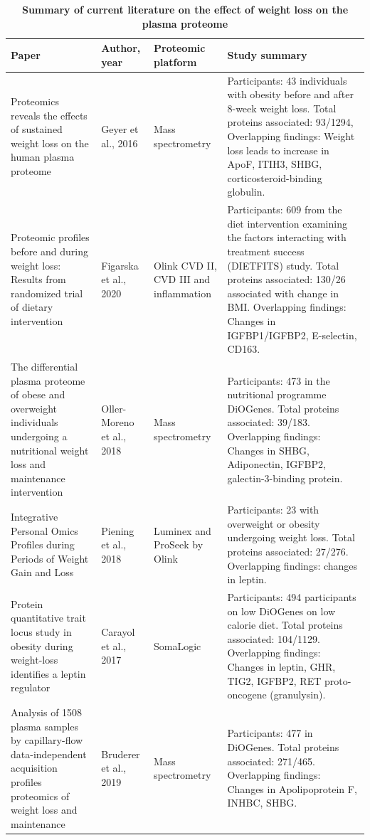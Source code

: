 \documentclass[11pt,twoside]{bristolthesis}
\begin{document}
\begin{landscape}\begin{table}

\caption[Summary of current literature on the effect of weight loss on the plasma proteome]{\label{tab:weight-loss-protein}\textbf{Summary of current literature on the effect of weight loss on the plasma proteome}}
\centering
\begin{tabu} to 
\toprule
Paper & Author, year & Proteomic platform & Study summary\\
\midrule
Proteomics reveals the effects of sustained weight loss on the human plasma proteome & Geyer et al., 2016 & Mass spectrometry & Participants: 43 individuals with obesity before and after 8-week weight loss.
Total proteins associated: 93/1294,
Overlapping findings: Weight loss leads to increase in ApoF, ITIH3, SHBG, corticosteroid-binding globulin.\\
Proteomic profiles before and during weight loss: Results from randomized trial of dietary intervention & Figarska et al., 2020 & Olink CVD II, CVD III and inflammation & Participants: 609 from the diet intervention examining the factors interacting with treatment success (DIETFITS) study.
Total proteins associated: 130/26 associated with change in BMI.
Overlapping findings: Changes in IGFBP1/IGFBP2, E-selectin, CD163.\\
The differential plasma proteome of obese and overweight individuals undergoing a nutritional weight loss and maintenance intervention & Oller-Moreno et al., 2018 & Mass spectrometry & Participants: 473 in the nutritional programme DiOGenes.
Total proteins associated: 39/183.
Overlapping findings: Changes in SHBG, Adiponectin, IGFBP2, galectin-3-binding protein.\\
Integrative Personal Omics Profiles during Periods of Weight Gain and Loss & Piening et al., 2018 & Luminex and ProSeek by Olink & Participants: 23 with overweight or obesity undergoing weight loss.
Total proteins associated: 27/276.
Overlapping findings: changes in leptin.\\
Protein quantitative trait locus study in obesity during weight-loss identifies a leptin regulator & Carayol et al., 2017 & SomaLogic & Participants: 494 participants on low DiOGenes on low calorie diet.
Total proteins associated: 104/1129.
Overlapping findings: Changes in leptin, GHR, TIG2, IGFBP2, RET proto-oncogene (granulysin).\\
\addlinespace
Analysis of 1508 plasma samples by capillary-flow data-independent acquisition profiles proteomics of weight loss and maintenance & Bruderer et al., 2019 & Mass spectrometry & Participants: 477 in DiOGenes.
Total proteins associated: 271/465.
Overlapping findings: Changes in Apolipoprotein F, INHBC, SHBG.\\
\bottomrule
\end{tabu}
\end{table}
\end{landscape}
\end{document}
